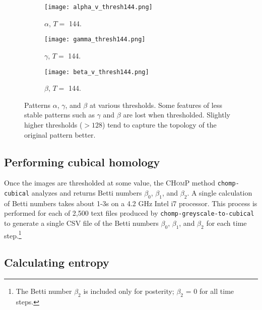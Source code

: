 \begin{figure}[pt]
        \begin{subfigure}[b]{0.25\textwidth}
                \texttt{[image: alpha\_v\_thresh144.png]}
                \caption{$\alpha$, $T =$ 144.}
                \label{fig:alpha_144}
        \end{subfigure} \quad
         \begin{subfigure}[b]{0.25\textwidth}
                \texttt{[image: gamma\_thresh144.png]}
                \caption{$\gamma$, $T =$ 144.}
                \label{fig:gamma_144}
        \end{subfigure} \quad
         \begin{subfigure}[b]{0.25\textwidth}
                \texttt{[image: beta\_v\_thresh144.png]}
                \caption{$\beta$, $T =$ 144.}
                \label{fig:beta_144}
        \end{subfigure} \hfill
        \caption{Patterns $\alpha$, $\gamma$, and $\beta$ at various thresholds. Some features of less stable patterns such as $\gamma$ and $\beta$ are lost when thresholded. Slightly higher thresholds ($>128$) tend to capture the topology of the original pattern better.}\label{fig:thresholds}
\end{figure}

\subsection{Performing cubical homology} \label{sect:chomping}

Once the images are thresholded at some value, the \textsc{CHomP} method \texttt{chomp-cubical} analyzes and returns Betti numbers $\beta_0$, $\beta_1$, and $\beta_2$.  A single calculation of Betti numbers takes about 1-3s on a 4.2 GHz Intel i7 processor. This process is performed for each of 2,500 text files produced by \texttt{chomp-greyscale-to-cubical} to generate a single CSV file of the Betti numbers $\beta_0$, $\beta_1$, and $\beta_2$ for each time step.\footnote{The Betti number $\beta_2$ is included only for posterity; $\beta_2$ = 0 for all time steps.}

\subsection{Calculating entropy} \label{sect:entropy}

